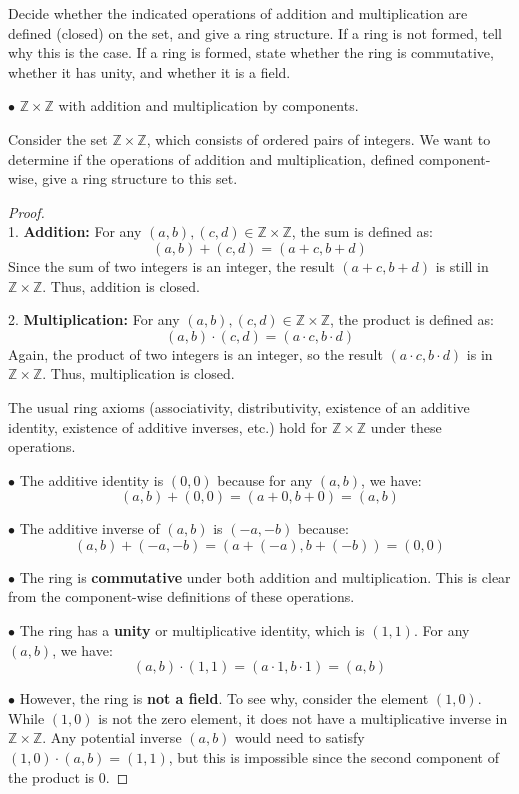 \documentclass[12pt]{amsart}
\theoremstyle{definition}
\numberwithin{equation}{section}
\theoremstyle{plain}
\newcommand{\Z}{\mathbb{Z}}
\begin{document}
\begin{exercise}{9} 
    Decide whether the indicated operations of addition and multiplication are defined (closed) on the set, and give a ring structure. 
    If a ring is not formed, tell why this is the case. If a ring is formed, state whether the ring is commutative, whether it has unity, and whether it is a field.
    
    $\bullet$ $\Z \times \Z$ with addition and multiplication by components.

    Consider the set \(\Z \times\Z \), which consists of ordered pairs of integers. We want to determine if the operations of addition and multiplication, defined component-wise, give a ring structure to this set.

\begin{proof} $ $ \\
1. \textbf{Addition:} For any \( (a, b), (c, d) \in\Z \times\Z \), the sum is defined as:
\[ (a, b) + (c, d) = (a+c, b+d) \]
Since the sum of two integers is an integer, the result \( (a+c, b+d) \) is still in \(\Z \times\Z \). Thus, addition is closed.

2. \textbf{Multiplication:} For any \( (a, b), (c, d) \in\Z \times\Z \), the product is defined as:
\[ (a, b) \cdot (c, d) = (a \cdot c, b \cdot d) \]
Again, the product of two integers is an integer, so the result \( (a \cdot c, b \cdot d) \) is in \(\Z \times\Z \). Thus, multiplication is closed.

The usual ring axioms (associativity, distributivity, existence of an additive identity, existence of additive inverses, etc.) hold for \(\Z \times\Z \) under these operations. 

$\bullet$ The additive identity is \( (0,0) \) because for any \( (a,b) \), we have:
\[ (a,b) + (0,0) = (a+0, b+0) = (a,b) \]

$\bullet$ The additive inverse of \( (a,b) \) is \( (-a,-b) \) because:
\[ (a,b) + (-a,-b) = (a+(-a), b+(-b)) = (0,0) \]

$\bullet$ The ring is \textbf{commutative} under both addition and multiplication. This is clear from the component-wise definitions of these operations.

$\bullet$ The ring has a \textbf{unity} or multiplicative identity, which is \( (1,1) \). For any \( (a,b) \), we have:
\[ (a,b) \cdot (1,1) = (a \cdot 1, b \cdot 1) = (a,b) \]

$\bullet$ However, the ring is \textbf{not a field}. To see why, consider the element \( (1,0) \). While \( (1,0) \) is not the zero element, it does not have a multiplicative inverse in \(\Z \times\Z \). Any potential inverse \( (a,b) \) would need to satisfy \( (1,0) \cdot (a,b) = (1,1) \), but this is impossible since the second component of the product is 0.

\end{proof}
\end{exercise}
\end{document}
